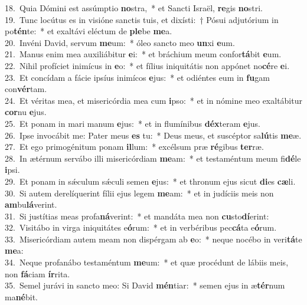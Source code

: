 {18.~}Quia Dómini est assúmptio \textbf{no}stra,~* et Sancti Israël, \textbf{re}gis \textbf{no}stri.\\
{19.~}Tunc locútus es in visióne sanctis tuis, et dixísti:~† Pósui adjutórium in po\textbf{tén}te:~* et exaltávi eléctum de \textbf{ple}be \textbf{me}a.\\
{20.~}Invéni David, servum \textbf{me}um:~* óleo sancto meo \textbf{un}xi \textbf{e}um.\\
{21.~}Manus enim mea auxiliábitur \textbf{e}i:~* et bráchium meum confor\textbf{tá}bit \textbf{e}um.\\
{22.~}Nihil profíciet inimícus in \textbf{e}o:~* et fílius iniquitátis non appónet no\textbf{cé}re \textbf{e}i.\\
{23.~}Et concídam a fácie ipsíus inimícos \textbf{e}jus:~* et odiéntes eum in \textbf{fu}gam con\textbf{vér}tam.\\
{24.~}Et véritas mea, et misericórdia mea cum \textbf{i}pso:~* et in nómine meo exaltábitur \textbf{cor}nu \textbf{e}jus.\\
{25.~}Et ponam in mari manum \textbf{e}jus:~* et in flumínibus \textbf{déx}teram \textbf{e}jus.\\
{26.~}Ipse invocábit me: Pater meus \textbf{es} tu:~* Deus meus, et suscéptor sa\textbf{lú}tis \textbf{me}æ.\\
{27.~}Et ego primogénitum ponam \textbf{il}lum:~* excélsum præ \textbf{ré}gibus \textbf{ter}ræ.\\
{28.~}In ætérnum servábo illi misericórdiam \textbf{me}am:~* et testaméntum meum fi\textbf{dé}le \textbf{i}psi.\\
{29.~}Et ponam in sǽculum sǽculi semen \textbf{e}jus:~* et thronum ejus sicut \textbf{di}es \textbf{cæ}li.\\
{30.~}Si autem derelíquerint fílii ejus legem \textbf{me}am:~* et in judíciis meis non \textbf{am}bu\textbf{lá}verint.\\
{31.~}Si justítias meas profa\textbf{ná}verint:~* et mandáta mea non \textbf{cu}sto\textbf{dí}erint:\\
{32.~}Visitábo in virga iniquitátes e\textbf{ó}rum:~* et in verbéribus pec\textbf{cá}ta e\textbf{ó}rum.\\
{33.~}Misericórdiam autem meam non dispérgam ab \textbf{e}o:~* neque nocébo in veri\textbf{tá}te \textbf{me}a:\\
{34.~}Neque profanábo testaméntum \textbf{me}um:~* et quæ procédunt de lábiis meis, non \textbf{fá}ciam \textbf{ír}rita.\\
{35.~}Semel jurávi in sancto meo: Si David \textbf{mén}tiar:~* semen ejus in æ\textbf{tér}num ma\textbf{né}bit.\\
